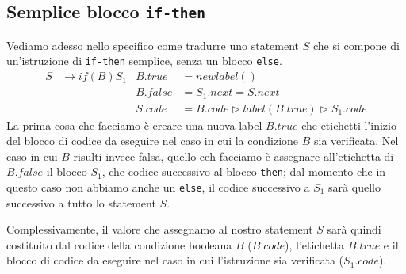 \documentclass[class=book, crop=false, oneside, 12pt]{standalone}
\begin{document}
\subsection{Semplice blocco \texttt{if-then}}
Vediamo adesso nello specifico come tradurre uno statement \(S\) che si compone di un'istruzione di \texttt{if-then} semplice, senza un blocco \texttt{else}.
\begin{align*}
    S &\to if (B) S_1 & B.true &= newlabel() \\
    & & B.false &= S_1.next = S.next \\
    & & S.code &= B.code \triangleright label(B.true) \triangleright S_1.code
\end{align*}
La prima cosa che facciamo è creare una nuova label \(B.true\) che etichetti l'inizio del blocco di codice da eseguire nel caso in cui la condizione \(B\) sia verificata. Nel caso in cui \(B\) risulti invece falsa, quello ceh facciamo è assegnare all'etichetta di \(B.false\) il blocco \(S_1\), che codice successivo al blocco \texttt{then}; dal momento che in questo caso non abbiamo anche un \texttt{else}, il codice successivo a \(S_1\) sarà quello successivo a tutto lo statement \(S\).

Complessivamente, il valore che assegnamo al nostro statement \(S\) sarà quindi costituito dal codice della condizione booleana \(B\) (\(B.code\)), l'etichetta \(B.true\) e il blocco di codice da eseguire nel caso in cui l'istruzione sia verificata (\(S_1.code\)).
\end{document}
